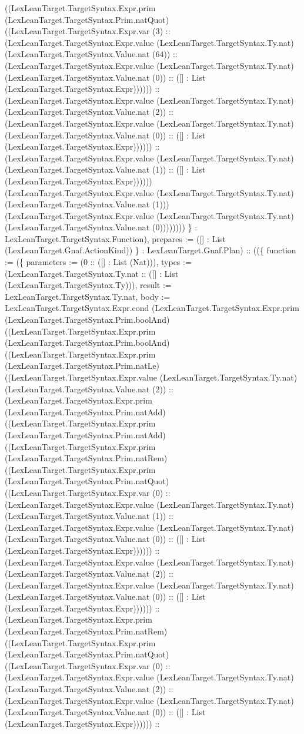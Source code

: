 \documentclass[11pt]{article}
\begin{document}
((LexLeanTarget.TargetSyntax.Expr.prim (LexLeanTarget.TargetSyntax.Prim.natQuot) ((LexLeanTarget.TargetSyntax.Expr.var (3) :: (LexLeanTarget.TargetSyntax.Expr.value (LexLeanTarget.TargetSyntax.Ty.nat) (LexLeanTarget.TargetSyntax.Value.nat (64)) :: (LexLeanTarget.TargetSyntax.Expr.value (LexLeanTarget.TargetSyntax.Ty.nat) (LexLeanTarget.TargetSyntax.Value.nat (0)) :: ([] : List (LexLeanTarget.TargetSyntax.Expr)))))) :: (LexLeanTarget.TargetSyntax.Expr.value (LexLeanTarget.TargetSyntax.Ty.nat) (LexLeanTarget.TargetSyntax.Value.nat (2)) :: (LexLeanTarget.TargetSyntax.Expr.value (LexLeanTarget.TargetSyntax.Ty.nat) (LexLeanTarget.TargetSyntax.Value.nat (0)) :: ([] : List (LexLeanTarget.TargetSyntax.Expr)))))) :: (LexLeanTarget.TargetSyntax.Expr.value (LexLeanTarget.TargetSyntax.Ty.nat) (LexLeanTarget.TargetSyntax.Value.nat (1)) :: ([] : List (LexLeanTarget.TargetSyntax.Expr)))))) (LexLeanTarget.TargetSyntax.Expr.value (LexLeanTarget.TargetSyntax.Ty.nat) (LexLeanTarget.TargetSyntax.Value.nat (1))) (LexLeanTarget.TargetSyntax.Expr.value (LexLeanTarget.TargetSyntax.Ty.nat) (LexLeanTarget.TargetSyntax.Value.nat (0)))))))) \} : LexLeanTarget.TargetSyntax.Function), prepares := ([] : List (LexLeanTarget.Gnaf.ActionKind)) \} : LexLeanTarget.Gnaf.Plan) :: ((\{ function := (\{ parameters := (0 :: ([] : List (Nat))), types := (LexLeanTarget.TargetSyntax.Ty.nat :: ([] : List (LexLeanTarget.TargetSyntax.Ty))), result := LexLeanTarget.TargetSyntax.Ty.nat, body := LexLeanTarget.TargetSyntax.Expr.cond (LexLeanTarget.TargetSyntax.Expr.prim (LexLeanTarget.TargetSyntax.Prim.boolAnd) ((LexLeanTarget.TargetSyntax.Expr.prim (LexLeanTarget.TargetSyntax.Prim.boolAnd) ((LexLeanTarget.TargetSyntax.Expr.prim (LexLeanTarget.TargetSyntax.Prim.natLe) ((LexLeanTarget.TargetSyntax.Expr.value (LexLeanTarget.TargetSyntax.Ty.nat) (LexLeanTarget.TargetSyntax.Value.nat (2)) :: (LexLeanTarget.TargetSyntax.Expr.prim (LexLeanTarget.TargetSyntax.Prim.natAdd) ((LexLeanTarget.TargetSyntax.Expr.prim (LexLeanTarget.TargetSyntax.Prim.natAdd) ((LexLeanTarget.TargetSyntax.Expr.prim (LexLeanTarget.TargetSyntax.Prim.natRem) ((LexLeanTarget.TargetSyntax.Expr.prim (LexLeanTarget.TargetSyntax.Prim.natQuot) ((LexLeanTarget.TargetSyntax.Expr.var (0) :: (LexLeanTarget.TargetSyntax.Expr.value (LexLeanTarget.TargetSyntax.Ty.nat) (LexLeanTarget.TargetSyntax.Value.nat (1)) :: (LexLeanTarget.TargetSyntax.Expr.value (LexLeanTarget.TargetSyntax.Ty.nat) (LexLeanTarget.TargetSyntax.Value.nat (0)) :: ([] : List (LexLeanTarget.TargetSyntax.Expr)))))) :: (LexLeanTarget.TargetSyntax.Expr.value (LexLeanTarget.TargetSyntax.Ty.nat) (LexLeanTarget.TargetSyntax.Value.nat (2)) :: (LexLeanTarget.TargetSyntax.Expr.value (LexLeanTarget.TargetSyntax.Ty.nat) (LexLeanTarget.TargetSyntax.Value.nat (0)) :: ([] : List (LexLeanTarget.TargetSyntax.Expr)))))) :: (LexLeanTarget.TargetSyntax.Expr.prim (LexLeanTarget.TargetSyntax.Prim.natRem) ((LexLeanTarget.TargetSyntax.Expr.prim (LexLeanTarget.TargetSyntax.Prim.natQuot) ((LexLeanTarget.TargetSyntax.Expr.var (0) :: (LexLeanTarget.TargetSyntax.Expr.value (LexLeanTarget.TargetSyntax.Ty.nat) (LexLeanTarget.TargetSyntax.Value.nat (2)) :: (LexLeanTarget.TargetSyntax.Expr.value (LexLeanTarget.TargetSyntax.Ty.nat) (LexLeanTarget.TargetSyntax.Value.nat (0)) :: ([] : List (LexLeanTarget.TargetSyntax.Expr)))))) :: 
\end{document}
